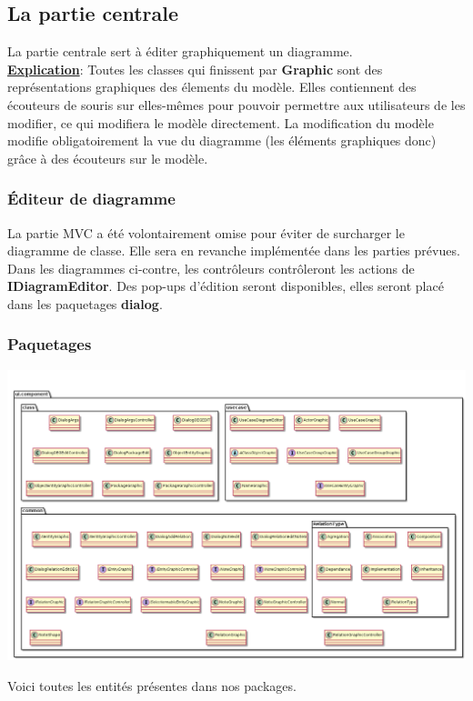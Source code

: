 \documentclass[a4paper,10pt]{article}
\begin{document}
  \subsection{La partie centrale}
    La partie centrale sert à éditer graphiquement un diagramme. \\
    \textbf{\underline{Explication}}: Toutes les classes qui finissent par \textbf{Graphic} sont des 
    représentations graphiques des élements du modèle. Elles contiennent des écouteurs de souris sur 
    elles-mêmes pour pouvoir permettre aux utilisateurs de les modifier, ce qui modifiera le modèle directement.
    La modification du modèle modifie obligatoirement la vue du diagramme (les éléments graphiques donc) 
    grâce à des écouteurs sur le modèle.
    \newpage
    \subsubsection{Éditeur de diagramme}
	La partie MVC a été volontairement omise pour éviter de surcharger le diagramme de classe. 
	Elle sera en revanche implémentée dans les parties prévues.\\
	Dans les diagrammes ci-contre, les contrôleurs contrôleront les actions de \textbf{IDiagramEditor}. 
	Des pop-ups d'édition seront disponibles, elles seront placé dans les paquetages \textbf{dialog}.
	\subsubsection{Paquetages}
	
	  \begin{center}
	      \includegraphics[width=\textwidth]{imgDAL/DiagramEditor_EntityPackage3.png}
	  \end{center}
	  Voici toutes les entités présentes dans nos packages.
	  \newpage
	
\end{document}

